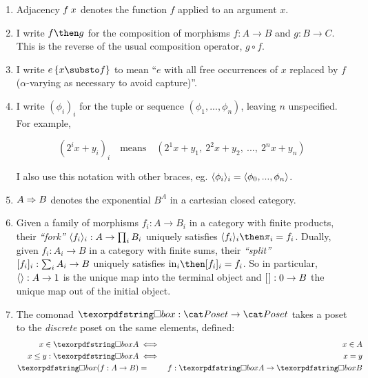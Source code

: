 \begin{enumerate}[flushleft,widest=0]
\item Adjacency $f\<x$ denotes the function $f$ applied to an argument $x$.

\item I write $f \then g$ for the composition of morphisms $f : A \to B$ and $g
  : B \to C$. This is the reverse of the usual composition operator, $g \circ
  f$.

\item I write $\subst{e}{x \substo f}$ to mean ``$e$ with all free occurrences of $x$
  replaced by $f$ ($\alpha$-varying as necessary to avoid capture)''.

  \newcommand\iexpr{\phi}
\item I write $(\iexpr_i)_i$ for the tuple or sequence $(\iexpr_1,
  ..., \iexpr_n)$, leaving $n$ unspecified. For example,

  \nopagebreak[2]
  \[ (2^ix + y_i)_i \quad\text{means}\quad
  (2^1x + y_1,~ 2^2x + y_2,~ ...,~ 2^nx + y_n) \]

  \noindent
  I also use this notation with other braces, eg. $\fork{\iexpr_i}_i =
  \fork{\iexpr_0, ..., \iexpr_n}$.

\item $A \Rightarrow B$ denotes the exponential $B^A$ in a cartesian closed category.

\item Given a family of morphisms $f_i : A \to B_i$ in a category with finite
  products, their \emph{``fork''} $\langle{f_i}\rangle_i : A \to \textstyle\prod_{i} B_i$
  uniquely satisfies $\fork{f_i}_i \then \pi_i = f_i$. Dually, given $f_i : A_i
  \to B$ in a category with finite sums, their \emph{``split''} $[{f_i}]_i :
  \sum_i A_i \to B$ uniquely satisfies $\injc_i \then \krof{f_i}_i = f_i$.
  So in particular, $\langle{}\rangle : A \to 1$ is the unique map into the terminal
  object and $[{\kern .08em}] : 0 \to B$ the unique map out of the initial object.

\item The comonad $\iso : \Poset \to \Poset$ takes a poset to the
  \emph{discrete} poset on the same elements, defined:
  \nopagebreak[2]
  \begin{eqnarray*}
    x \in \iso A &\iff& x \in A\\
    x \le y : \iso A &\iff& x = y\\
    \iso(f : A \to B) &=& f : \iso A \to \iso B
  \end{eqnarray*}

\end{enumerate}

